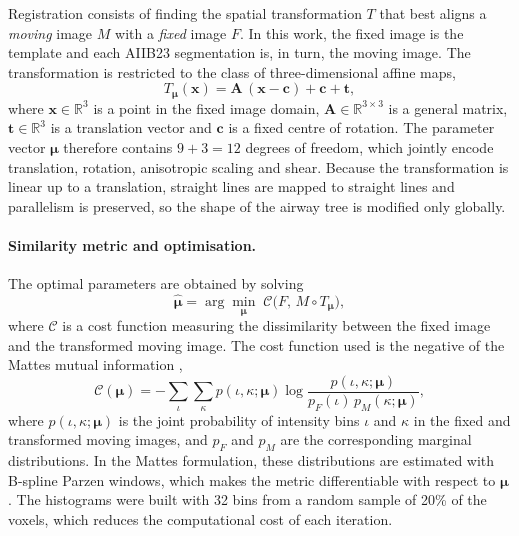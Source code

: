 Registration consists of finding the spatial transformation $T$ that best aligns
a \emph{moving} image $M$ with a \emph{fixed} image $F$. In this work, the fixed
image is the template and each AIIB23 segmentation is, in turn, the moving
image. The transformation is restricted to the class of three-dimensional affine
maps,
\begin{equation}
  T_{\boldsymbol{\mu}}(\mathbf{x}) = \mathbf{A}\,(\mathbf{x} - \mathbf{c}) + \mathbf{c} + \mathbf{t},
  \label{eq:affine}              %
\end{equation}
where $\mathbf{x} \in \mathbb{R}^3$ is a point in the fixed image domain,
$\mathbf{A} \in \mathbb{R}^{3\times 3}$ is a general matrix,
$\mathbf{t} \in \mathbb{R}^3$ is a translation vector and $\mathbf{c}$ is a
fixed centre of rotation. The parameter vector $\boldsymbol{\mu}$ therefore
contains $9 + 3 = 12$ degrees of freedom, which jointly encode translation,
rotation, anisotropic scaling and shear. Because the transformation is linear up
to a translation, straight lines are mapped to straight lines and parallelism is
preserved, so the shape of the airway tree is modified only globally.

\paragraph{Similarity metric and optimisation.}  %

The optimal parameters are obtained by solving
\begin{equation}
  \hat{\boldsymbol{\mu}} = \arg\min_{\boldsymbol{\mu}} \;
  \mathcal{C}\big(F,\, M \circ T_{\boldsymbol{\mu}}\big),
  \label{eq:optimisation}        %
\end{equation}
where $\mathcal{C}$ is a cost function measuring the dissimilarity between the
fixed image and the transformed moving image. The cost function used is the
negative of the Mattes mutual information \cite{mattes2003petct},
\begin{equation}
  \mathcal{C}(\boldsymbol{\mu}) = -\sum_{\iota}\sum_{\kappa} p(\iota,\kappa;\boldsymbol{\mu})
  \log \frac{p(\iota,\kappa;\boldsymbol{\mu})}{p_F(\iota)\, p_M(\kappa;\boldsymbol{\mu})},
  \label{eq:mattes}              %
\end{equation}
where $p(\iota,\kappa;\boldsymbol{\mu})$ is the joint probability of intensity
bins $\iota$ and $\kappa$ in the fixed and transformed moving images, and $p_F$
and $p_M$ are the corresponding marginal distributions. In the Mattes
formulation, these distributions are estimated with B-spline Parzen windows,
which makes the metric differentiable with respect to $\boldsymbol{\mu}$. The
histograms were built with 32 bins from a random sample of 20\% of the voxels,
which reduces the computational cost of each iteration.


